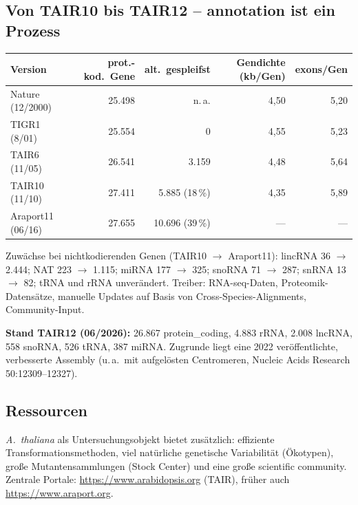 \subsection*{Von TAIR10 bis TAIR12 -- \gls{annotation} ist ein Prozess}\label{subsec:von-tair10-bis-tair12----annotation-ist-ein-prozess}
\begin{mytable}
    \begin{tabular}{@{}|l|r|r|r|r|@{}}
        \hline
        \textbf{Version} & \textbf{prot.-kod.\ Gene} & \textbf{alt.\ gespleifst} & \textbf{Gendichte (kb/Gen)} & \textbf{\gls{exon}s/Gen} \\
        \hline
        Nature (12/2000) & 25.498 & n.\,a. & 4,50 & 5,20 \\
        TIGR1 (8/01) & 25.554 & 0 & 4,55 & 5,23 \\
        TAIR6 (11/05) & 26.541 & 3.159 & 4,48 & 5,64 \\
        TAIR10 (11/10) & 27.411 & 5.885 (18\,\%) & 4,35 & 5,89 \\
        Araport11 (06/16) & 27.655 & 10.696 (39\,\%) & --- & --- \\
        \hline
    \end{tabular}
\end{mytable}

Zuwächse bei nichtkodierenden Genen (TAIR10 $\to$ Araport11): lincRNA 36 $\to$ 2.444; NAT 223 $\to$ 1.115; miRNA 177 $\to$ 325; snoRNA 71 $\to$ 287; snRNA 13 $\to$ 82; tRNA und rRNA unverändert.
Treiber: RNA-seq-Daten, Proteomik-Datensätze, manuelle Updates auf Basis von Cross-Species-Alignments, Community-Input.

\textbf{Stand TAIR12 (06/2026):} 26.867 protein\_coding, 4.883 rRNA, 2.008 lncRNA, 558 snoRNA, 526 tRNA, 387 miRNA. Zugrunde liegt eine 2022 veröffentlichte, verbesserte Assembly (u.\,a.\ mit aufgelösten Centromeren, Nucleic Acids Research 50:12309--12327).


\subsection*{Ressourcen}\label{subsec:ressourcen}
\emph{A.~thaliana} als Untersuchungsobjekt bietet zusätzlich: effiziente Transformationsmethoden, viel natürliche
genetische Variabilität (Ökotypen), gro{\ss}e Mutantensammlungen (Stock Center) und eine gro{\ss}e scientific community.
Zentrale Portale: \url{https://www.arabidopsis.org} (TAIR), früher auch \url{https://www.araport.org}.

